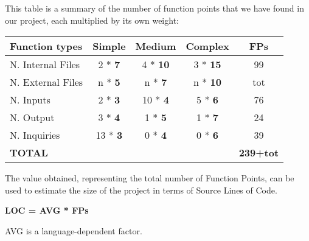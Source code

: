 This table is a summary of the number of function points that we have found in our project, each multiplied by its own weight:

\begin{center}
	\begin{tabular}{|l|c|c|c||c|}
		\hline
		\textbf{Function types} 	& \textbf{Simple} 	& \textbf{Medium} 	& \textbf{Complex}	& \textbf{FPs} \\
		\hline
		N. Internal Files 	& 2 * \textbf{7} 	& 4 * \textbf{10} 	& 3 * \textbf{15} & 99 \\
		\hline
		N. External Files 	& n * \textbf{5} 	& n * \textbf{7} 	& n * \textbf{10} & tot \\
		\hline
		N. Inputs 	& 2 * \textbf{3} 	& 10 * \textbf{4} 	& 5 * \textbf{6} & 76  \\
		\hline
		N. Output 	& 3 * \textbf{4} 	& 1 * \textbf{5} 	& 1 * \textbf{7} & 24 \\
		\hline
		N. Inquiries 	& 13 * \textbf{3} 	& 0 * \textbf{4} 	& 0 * \textbf{6}  & 39\\	
		\hline \hline
		\textbf{TOTAL} 	&  	& 	& 	& \textbf{239+tot} \\
		\hline
	\end{tabular}
\end{center}

The value obtained, representing the total number of Function Points, can be used to estimate the size of the project in terms of Source Lines of Code. \\
\begin{center}
	\textbf{LOC = AVG * FPs}
\end{center}
AVG is a language-dependent factor.


